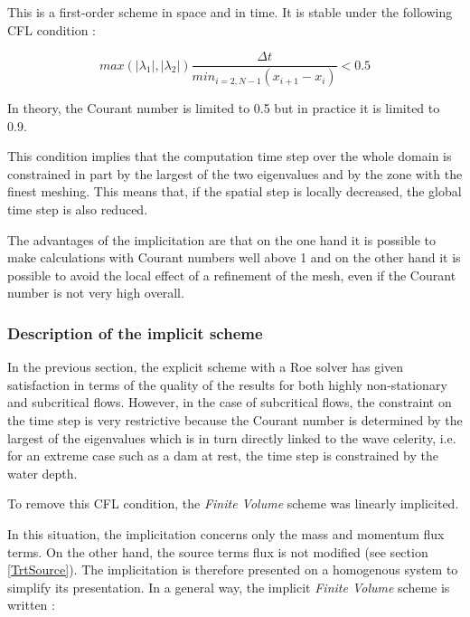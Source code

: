 This is a first-order scheme in space and in time. It is stable under the following CFL condition :

\begin{equation}
 max(|\lambda_1|,|\lambda_2|) \frac{\Delta t}{min_{i=2,N-1} (x_{i+1}-x_i)} < 0.5
\end{equation}

In theory, the Courant number is limited to 0.5 but in practice it is limited to 0.9.

This condition implies that the computation time step over the whole domain is constrained in part by the largest of the two eigenvalues and by the zone with the finest meshing. This means that, if the spatial step is locally decreased, the global time step is also reduced.

The advantages of the implicitation are that on the one hand it is possible to make calculations with Courant numbers well above 1 and on the other hand it is possible to avoid the local effect of a refinement of the mesh, even if the Courant number is not very high overall.

\subsubsection{Description of the implicit scheme}

In the previous section, the explicit scheme with a Roe solver has given satisfaction in terms of the quality of the results for both highly non-\linebreak stationary and subcritical flows. However, in the case of subcritical flows, the constraint on the time step is very restrictive because the Courant number is determined by the largest of the eigenvalues which is in turn directly linked to the wave celerity, i.e. for an extreme case such as a dam at rest, the time step is constrained by the water depth.

To remove this CFL condition, the \textit{Finite Volume} scheme was linearly implicited.

In this situation, the implicitation concerns only the mass and momentum flux terms. On the other hand, the source terms flux is not modified (see section \ref{TrtSource}). The implicitation is therefore presented on a homogenous system to simplify its presentation. In a general way, the implicit \textit{Finite Volume} scheme is written :

